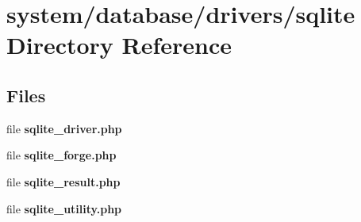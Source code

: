 \section{system/database/drivers/sqlite Directory Reference}
\label{dir_c2a2361d9a15fddf945d32691b39e55d}
\subsection*{Files}
\begin{DoxyCompactItemize}
\item 
file {\bf sqlite\-\_\-driver.\-php}
\item 
file {\bf sqlite\-\_\-forge.\-php}
\item 
file {\bf sqlite\-\_\-result.\-php}
\item 
file {\bf sqlite\-\_\-utility.\-php}
\end{DoxyCompactItemize}
